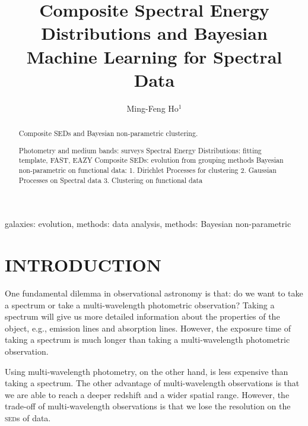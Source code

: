\documentclass{ar-1col}
\begin{document}

\title{Composite Spectral Energy Distributions and Bayesian Machine Learning for Spectral Data}

\author{Ming-Feng Ho$^1$
}

\begin{abstract}

    
Composite SEDs and Bayesian non-parametric clustering.

Photometry and medium bands: surveys
Spectral Energy Distributions: fitting template, FAST, EAZY
Composite SEDs: evolution from grouping methods
Bayesian non-parametric on functional data:
1. Dirichlet Processes for clustering
2. Gaussian Processes on Spectral data
3. Clustering on functional data 

\end{abstract}

\begin{keywords}
galaxies: evolution, methods: data analysis, methods: Bayesian non-parametric
\end{keywords}
\maketitle

\tableofcontents


\section{INTRODUCTION}
One fundamental dilemma in observational astronomy is that: do we want to take a spectrum or take a multi-wavelength photometric observation? 
Taking a spectrum will give us more detailed information about the properties of the object, e.g., emission lines and absorption lines. 
However, the exposure time of taking a spectrum is much longer than taking a multi-wavelength photometric observation. 

Using multi-wavelength photometry, on the other hand, is less expensive than taking a spectrum. 
The other advantage of multi-wavelength observations is that we are able to reach a deeper redshift and a wider spatial range.
However, the trade-off of multi-wavelength observations is that we lose the resolution on the \textsc{sed}s of data.
\end{document}
